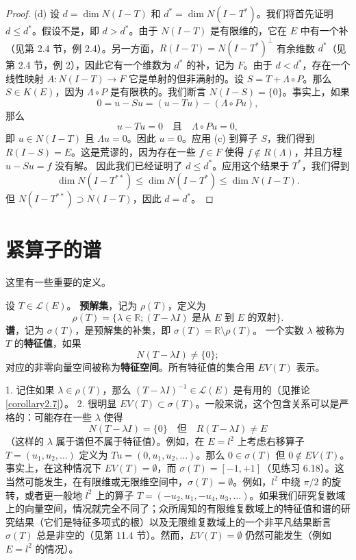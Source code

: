 \begin{proof}
(d) 设 \(d=\dim N(I-T)\) 和 \(d^*=\dim N(I-T^*)\)。我们将首先证明 \(d \le d^*\)。假设不是，即 \(d>d^*\)。由于 \(N(I-T)\) 是有限维的，它在 \(E\) 中有一个补（见第 2.4 节，例 2.4）。另一方面，\(R(I-T)=N(I-T^*)^\perp\) 有余维数 \(d^*\)（见第 2.4 节，例 2），因此它有一个维数为 \(d^*\) 的补，记为 \(F\)。由于 \(d<d^*\)，存在一个线性映射 \(A:N(I-T) \to F\) 它是单射的但非满射的。设 \(S=T+\Lambda \circ P\)。那么 \(S \in K(E)\)，因为 \(\Lambda \circ P\) 是有限秩的。我们断言 \(N(I-S) = \{0\}\)。事实上，如果
\[
0 = u - Su = (u-Tu) - (\Lambda \circ Pu),
\]
那么
\[
u-Tu=0 \quad \text{且} \quad \Lambda \circ Pu = 0,
\]
即 \(u \in N(I-T)\) 且 \(\Lambda u = 0\)。因此 \(u=0\)。应用 (c) 到算子 \(S\)，我们得到 \(R(I-S)=E\)。这是荒谬的，因为存在一些 \(f \in F\) 使得 \(f \notin R(\Lambda)\)，并且方程 \(u-Su=f\) 没有解。
因此我们已经证明了 \(d \le d^*\)。应用这个结果于 \(T^*\)，我们得到
\[
\dim N(I-T^{**}) \le \dim N(I-T^*) \le \dim N(I-T).
\]
但 \(N(I-T^{**}) \supset N(I-T)\)，因此 \(d=d^*\)。
\end{proof}

\section{紧算子的谱}
这里有一些重要的定义。

\begin{definition}
设 \(T \in \mathcal{L}(E)\)。
\textbf{预解集}，记为 \(\rho(T)\)，定义为
\[
\rho(T) = \{\lambda \in \mathbb{R}; (T - \lambda I) \text{ 是从 } E \text{ 到 } E \text{ 的双射}\}.
\]
\textbf{谱}，记为 \(\sigma(T)\)，是预解集的补集，即 \(\sigma(T) = \mathbb{R} \setminus \rho(T)\)。
一个实数 \(\lambda\) 被称为 \(T\) 的\textbf{特征值}，如果
\[
N(T - \lambda I) \ne \{0\};
\]
对应的非零向量空间被称为\textbf{特征空间}。所有特征值的集合用 \(EV(T)\) 表示。
\end{definition}
1. 记住如果 \(\lambda \in \rho(T)\)，那么 \((T - \lambda I)^{-1} \in \mathcal{L}(E)\) 是有用的（见推论 \ref{corollary2.7}）。
2. 很明显 \(EV(T) \subset \sigma(T)\)。一般来说，这个包含关系可以是严格的：可能存在一些 \(\lambda\) 使得
\[
N(T - \lambda I) = \{0\} \quad \text{但} \quad R(T - \lambda I) \ne E
\]
（这样的 \(\lambda\) 属于谱但不属于特征值）。例如，在 \(E = l^2\) 上考虑右移算子 \(T=(u_1, u_2, \ldots)\) 定义为 \(Tu=(0, u_1, u_2, \ldots)\)。那么 \(0 \in \sigma(T)\) 但 \(0 \notin EV(T)\)。事实上，在这种情况下 \(EV(T) = \emptyset\)，而 \(\sigma(T) = [-1, +1]\)（见练习 6.18）。这当然可能发生，在有限维或无限维空间中，\(\sigma(T)=\emptyset\)。例如，\(l^2\) 中绕 \(\pi/2\) 的旋转，或者更一般地 \(l^2\) 上的算子 \(T = (-u_2, u_1, -u_4, u_3, \ldots)\)。如果我们研究复数域上的向量空间，情况就完全不同了；众所周知的有限维复数域上的特征值和谱的研究结果（它们是特征多项式的根）以及无限维复数域上的一个非平凡结果断言 \(\sigma(T)\) 总是非空的（见第 11.4 节）。然而，\(EV(T)=\emptyset\) 仍然可能发生（例如 \(E=l^2\) 的情况）。

